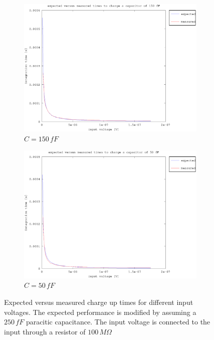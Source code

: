 \documentclass{article}
\begin{document}
\begin{figure}
\begin{subfigure}[b]{0.475\textwidth}
	    \centering 
	    \includegraphics[width=\textwidth]{fig/vin_vs_time_150fF_250fF.eps}
	    \caption[]%
	    {$C=150\,fF$}    
	    \label{fig:e_vs_m_150fF_250fF}
	\end{subfigure}
	\quad
	\begin{subfigure}[b]{0.475\textwidth}   
	    \centering 
	    \includegraphics[width=\textwidth]{fig/vin_vs_time_50fF_250fF.eps}
	    \caption[]%
	    {$C=50\,fF$}    
	    \label{fig:e_vs_m_50fF_250fF}
	\end{subfigure}
	\caption{Expected versus measured charge up times for different input voltages. The expected performance is modified by assuming a $250\,fF$ paracitic capacitance. The input voltage is connected to the input through a resistor of $100\,M\Omega$}
	\label{fig:e_vs_m_250fF}
\end{figure}
\end{document}
